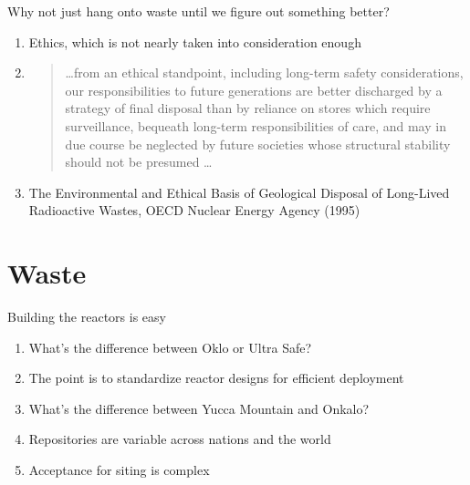 \documentclass[aspectratio=1610,pdftex,dvipsnames,compress,xcolor={dvipsnames}]{beamer}
\begin{document}
\begin{frame}{Why not just hang onto waste until we figure out something better?}
    \begin{enumerate}[series=outerlist,topsep=0pt,itemsep=21pt,leftmargin=*,label=(\arabic*)]
        \item[]Ethics, which is not nearly taken into consideration enough
        \item[]
            \begin{quote}
                \ldots from an ethical standpoint, including long-term safety considerations, our responsibilities to future generations are better discharged by a strategy of final disposal than by reliance on stores which require surveillance, bequeath long-term responsibilities of care, and may in due course be neglected by future societies whose
structural stability should not be presumed \ldots
            \end{quote}
        \item[]The Environmental and Ethical Basis of Geological Disposal of Long-Lived Radioactive Wastes, OECD Nuclear Energy Agency (1995)
    \end{enumerate}
\end{frame}


\section{Waste}


\addtocounter{framenumber}{-1} 
\begin{frame}{Building the reactors is easy}
    \begin{enumerate}[series=outerlist,topsep=0pt,itemsep=21pt,leftmargin=*,label=(\arabic*)]
        \item[]What's the difference between Oklo or Ultra Safe?
        \item[]The point is to standardize reactor designs for efficient deployment
        \item[]What's the difference between Yucca Mountain and Onkalo?
        \item[]Repositories are variable across nations and the world
        \item[]Acceptance for siting is complex
    \end{enumerate}
\end{frame}
\end{document}

